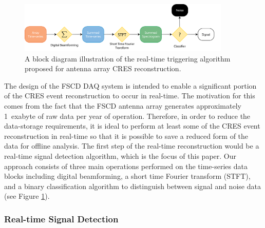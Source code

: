 \begin{figure}[htbp]
    \centering
    \includegraphics[width=0.9\textwidth]{figs/Chapter-4/230316_trigger_flowchart.png}
    \caption{A block diagram illustration of the real-time triggering algorithm proposed for antenna array CRES reconstruction.}
    \label{fig:signal_detection_routine}
\end{figure}

The design of the FSCD DAQ system is intended to enable a significant portion of the CRES event reconstruction to occur in real-time. The motivation for this comes from the fact that the FSCD antenna array generates approximately 1~exabyte of raw data per year of operation. Therefore, in order to reduce the data-storage requirements, it is ideal to perform at least some of the CRES event reconstruction in real-time so that it is possible to save a reduced form of the data for offline analysis. The first step of the real-time reconstruction would be a real-time signal detection algorithm, which is the focus of this paper. Our approach consists of three main operations performed on the time-series data blocks including digital beamforming, a short time Fourier transform (STFT), and a binary classification algorithm to distinguish between signal and noise data (see Figure \ref{fig:signal_detection_routine}). 

\subsubsection{Real-time Signal Detection}
\label{sec:bf-and-stft}

